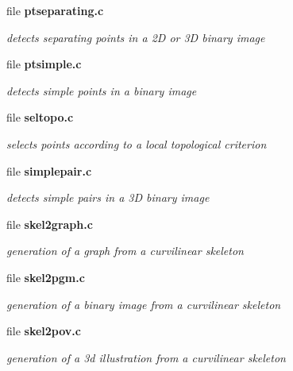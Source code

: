 \begin{CompactItemize}
\item 
file \bf{ptseparating.c}
\begin{CompactList}\small\item\em detects separating points in a 2D or 3D binary image \item\end{CompactList}

\item 
file \bf{ptsimple.c}
\begin{CompactList}\small\item\em detects simple points in a binary image \item\end{CompactList}

\item 
file \bf{seltopo.c}
\begin{CompactList}\small\item\em selects points according to a local topological criterion \item\end{CompactList}

\item 
file \bf{simplepair.c}
\begin{CompactList}\small\item\em detects simple pairs in a 3D binary image \item\end{CompactList}

\item 
file \bf{skel2graph.c}
\begin{CompactList}\small\item\em generation of a graph from a curvilinear skeleton \item\end{CompactList}

\item 
file \bf{skel2pgm.c}
\begin{CompactList}\small\item\em generation of a binary image from a curvilinear skeleton \item\end{CompactList}

\item 
file \bf{skel2pov.c}
\begin{CompactList}\small\item\em generation of a 3d illustration from a curvilinear skeleton \item\end{CompactList}


\end{CompactItemize}
